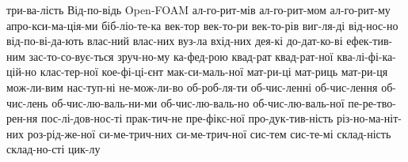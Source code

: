 
\hyphenation
{
  три-ва-лість
  Від-по-відь
  Open-FOAM
  ал-го-рит-мів
  ал-го-рит-мом
  ал-го-рит-му
  апро-кси-ма-ція-ми
  біб-ліо-те-ка
  век-тор
  век-то-ри
  век-то-рів
  виг-ля-ді
  від-нос-но
  від-по-ві-да-ють
  влас-ний
  влас-них
  вуз-ла
  вхід-них
  дея-кі
  до-дат-ко-ві
  ефек-тив-ним
  зас-то-со-вує-ться
  зруч-но-му
  ка-фед-рою
  квад-рат
  квад-рат-ної
  ква-лі-фі-ка-цій-но
  клас-тер-ної
  кое-фі-ці-єнт
  мак-си-маль-ної
  мат-ри-ці
  мат-риць
  мат-ри-ця
  мож-ли-вим
  нас-туп-ні
  не-мож-ли-во
  об-роб-ля-ти
  об-чис-ленні
  об-чис-лення
  об-чис-лень
  об-чис-лю-валь-ни-ми
  об-чис-лю-валь-но
  об-чис-лю-валь-ної
  пе-ре-тво-рен-ня
  пос-лі-дов-нос-ті
  прак-тич-не
  пре-фікс-ної
  про-дук-тив-ність
  різ-но-ма-ніт-них
  роз-рід-же-ної
  си-ме-трич-них
  си-ме-трич-ної
  сис-тем
  сис-те-мі
  склад-ність
  склад-но-сті
  цик-лу
}





\ESKDsetPadding{10mm}{10mm}

\makeatletter
\renewcommand{\l@section}{\@dottedtocline{0}{1.5em}{2.3em}}
\renewcommand{\l@subsection}{\@dottedtocline{1}{2.5em}{2.3em}}
\renewcommand{\l@subsubsection}{\@dottedtocline{2}{3.5em}{2.3em}}
\makeatother

\newcommand{\docseparator}[1]{
  \newpage
  \thispagestyle{empty}
  \ESKDthisStyle{empty}
  \noindent\parbox[c][\vsize][c]{\hsize}
  {\centering\fontsize{36pt}{40pt}\selectfont#1}

  \setcounter{page}{0}
  \setcounter{section}{0}
  \setcounter{subsection}{0}
  \setcounter{subsubsection}{0}
}

\newcommand{\apptitletop}[1]{%
ДОДАТОК #1\par
Алгоритм динамічної маршрутизації мультікастової розсилки}

